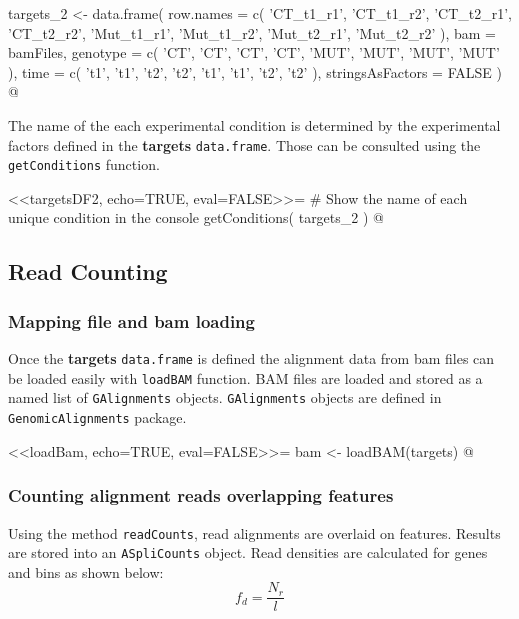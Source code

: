 \documentclass{article}
\begin{document}
targets_2 <- data.frame( row.names = c( 'CT_t1_r1',  'CT_t1_r2',
                                        'CT_t2_r1',  'CT_t2_r2',
                                        'Mut_t1_r1', 'Mut_t1_r2',
                                        'Mut_t2_r1', 'Mut_t2_r2' ),
                         bam = bamFiles,
                         genotype = c( 'CT',  'CT',  'CT',  'CT', 
                                       'MUT', 'MUT', 'MUT', 'MUT' ),
                         time     = c( 't1', 't1', 't2', 't2', 
                                       't1', 't1', 't2', 't2' ),
                         stringsAsFactors = FALSE )
@

The name of the each experimental condition is determined by the experimental
factors defined in the \textbf{targets} \texttt{data.frame}. Those can be
consulted using the \texttt{getConditions} function. 

<<targetsDF2, echo=TRUE, eval=FALSE>>=
# Show the name of each unique condition in the console
getConditions( targets_2 )
@

\subsection{Read Counting }

\subsubsection{Mapping file and bam loading } 

Once the \textbf{targets} \texttt{data.frame} is defined the alignment data
from bam files can be loaded easily with \texttt{loadBAM} function. BAM files
are loaded and stored as a named list of \texttt{GAlignments} objects.
\texttt{GAlignments} objects are defined in \texttt{GenomicAlignments} package.

<<loadBam, echo=TRUE, eval=FALSE>>=
bam <- loadBAM(targets)
@

\subsubsection{Counting alignment reads overlapping features } 

Using the method \texttt{readCounts}, read alignments are overlaid on features.
Results are stored into an \texttt{ASpliCounts} object. Read densities are
calculated for genes and bins as shown below:
\begin{equation*}{
  f_{d} = \frac{ N_{r} }{ l }
}
\end{equation*}
\end{document}
